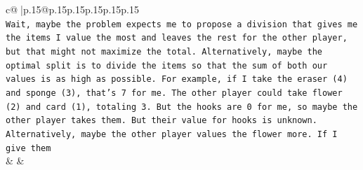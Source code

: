 \documentclass{article}
\begin{document}
{\begin{supertabular}{c@{$\;$}|p{.15\linewidth}@{}p{.15\linewidth}p{.15\linewidth}p{.15\linewidth}p{.15\linewidth}p{.15\linewidth}}
{{{\\ 
\texttt{Wait, maybe the problem expects me to propose a division that gives me the items I value the most and leaves the rest for the other player, but that might not maximize the total. Alternatively, maybe the optimal split is to divide the items so that the sum of both our values is as high as possible. For example, if I take the eraser (4) and sponge (3), that's 7 for me. The other player could take flower (2) and card (1), totaling 3. But the hooks are 0 for me, so maybe the other player takes them. But their value for hooks is unknown. Alternatively, maybe the other player values the flower more. If I give them} \\
            }
        }
    }
    & & \\ \\


\end{supertabular}}
\end{document}
